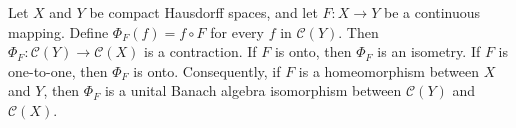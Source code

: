 Let $X$ and $Y$ be compact Hausdorff spaces, and let $F: X \to Y$ be a continuous mapping. Define $\Phi_F(f) = f \circ F$ for every $f$ in $\mathcal{C}(Y)$. Then $\Phi_F: \mathcal{C}(Y) \to \mathcal{C}(X)$ is a contraction. If $F$ is onto, then $\Phi_F$ is an isometry. If $F$ is one-to-one, then $\Phi_F$ is onto. Consequently, if $F$ is a homeomorphism between $X$ and $Y$, then $\Phi_F$ is a unital Banach algebra isomorphism between $\mathcal{C}(Y)$ and $\mathcal{C}(X)$.
